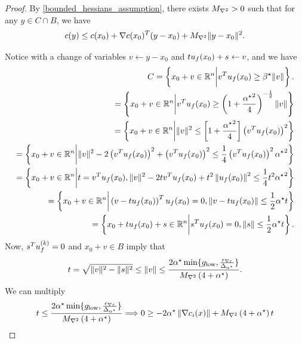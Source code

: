 \begin{proof}
By \cref{bounded_hessians_assumption}, there exists ${M_{\nabla^2}} > 0$ such that for any $y \in C \cap B$, we have
\begin{align*}
c(y) \le c(x_0) + \nabla c(x_0)^T (y - x_0) + {M_{\nabla^2}} \|y - x_0\|^2.
\end{align*}

Notice with a change of variables $v \gets y-x_0$ and $t{u_{f}(x_0)} + s \gets v$, and we have
\begin{align*}
C = \left\{x_0 + v \in \mathbb R^n \bigg | v^T{u_{f}(x_0)} \ge \beta^{\star} \|v\| \right\}. \\
= \left\{x_0 + v \in \mathbb R^n \bigg | v^T{u_{f}(x_0)} \ge \left(1 + \frac {{ \alpha^{\star} }^2} 4\right)^{-\frac 1 2} \|v\| \right\} \\
= \left\{x_0 + v \in \mathbb R^n \bigg | \|v\|^2 \le \left[1 + \frac {{ \alpha^{\star} }^2} 4\right]\left(v^T{u_{f}(x_0)}\right)^2 \right\} \\
= \left\{x_0 + v \in \mathbb R^n \bigg | \|v\|^2 - 2 \left(v^T{u_{f}(x_0)}\right)^2 + \left(v^T{u_{f}(x_0)}\right)^2 \le \frac 1 4\left(v^T{u_{f}(x_0)}\right)^2 { \alpha^{\star} }^2 \right\} \\
= \left\{x_0 + v \in \mathbb R^n \bigg |  t =  v^T{u_{f}(x_0)}, \|v\|^2 - 2 t v^T{u_{f}(x_0)} + t^2\left\|{u_{f}(x_0)}\right\|^2 \le \frac 1 4t^2 { \alpha^{\star} }^2 \right\} \\
= \left\{x_0 + v \in \mathbb R^n \bigg | \left(v - t{u_{f}(x_0)}\right)^T {u_{f}(x_0)} = 0, \left\|v - t{u_{f}(x_0)}\right\| \le \frac 1 2 { \alpha^{\star} } t \right\} \\
= \left\{x_0 + t {u_{f}(x_0)} + s \in \mathbb R^n \bigg | s^T {u_{f}(x_0)} = 0, \|s\| \le \frac 1 2 { \alpha^{\star} } t \right\}.
\end{align*}
Now, $s^T {u^{(k)}_f} = 0$ and $x_0 + v \in B$ imply that
\begin{align*}
t = \sqrt{\|v\|^2  - \|s\|^2} \le \|v\| \le  \frac {2{ \alpha^{\star} }  \min\{{ g_{\textrm{low}} }, \frac{{\epsilon_{\nabla c}}}{{\Delta_{\alpha^{\star}}}}\}}{{M_{\nabla^2}}\left(4 + { \alpha^{\star} }\right)}.
\end{align*}
We can multiply
\begin{align*}
t \le \frac {2\minanglealpha  \min\{\mingrad, \frac{\mingradepsilon}{\minangledelta}\}}{\maxhessian\left(4 + \minanglealpha\right)}
\Longrightarrow 0 \ge -2\minanglealpha \left\|\nabla c_i(x)\right\| +  \maxhessian\left(4 + \minanglealpha\right) t

\end{align*}
\end{proof}
